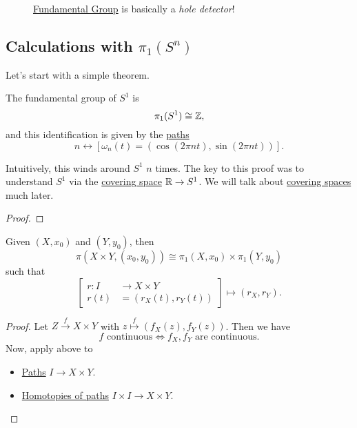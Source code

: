 \begin{figure}[H]
	\centering
	\caption{\hyperref[def:fundamental-group]{Fundamental Group} is basically a \emph{hole detector}!}
	\label{fig:fundamental-group-hole-detector}
\end{figure}

\subsection{Calculations with \(\pi _1(S^n)\)}
Let's start with a simple theorem.
\begin{theorem}
	The fundamental group of \(S^1\) is
	\[
		\pi _1(S^1)\cong \mathbb{\MakeUppercase{z}},
	\]
	and this identification is given by the \hyperref[def:path]{paths}
	\[
		n \leftrightarrow [\omega_{n}(t) = (\cos (2\pi nt), \sin (2\pi nt))].
	\]
\end{theorem}
\begin{remark}
	Intuitively, this winds around \(S^1\) \(n\) times. The key to this proof was to understand \(S^1\) via the \hyperref[def:covering-space]{covering space}
	\(\mathbb{\MakeUppercase{r}} \to S^1\). We will talk about \hyperref[def:covering-space]{covering spaces} much later.
\end{remark}
\begin{proof}
\end{proof}

\begin{theorem}
	Given \((X, x_0)\) and \((Y, y_0)\), then
	\[
		\pi (X\times Y, (x_0, y_0)) \cong \pi_1(X, x_0)\times \pi _1(Y, y_0)
	\]
	such that
	\[
		\left[\begin{alignedat}{3}
				r\colon I&\to X\times Y\\
				r(t) &= \left(r_X(t), r_Y(t)\right)
			\end{alignedat}\right] \mapsto (r_{X}, r_{Y}).
	\]
\end{theorem}
\begin{proof}
	Let \(Z\overset{f}{\to} X\times Y\) with \(z\overset{f}{\mapsto} \left(f_{X}(z), f_{Y}(z)\right)\). Then we have
	\[
		f\text{ continuous}\iff f_{X}, f_{Y}  \text{ are continuous}.
	\]
	Now, apply above to
	\begin{itemize}
		\item \hyperref[def:path]{Paths} \(I\to X\times Y\).
		\item \hyperref[def:homotopy-path]{Homotopies of paths} \(I\times I\to X\times Y\).
	\end{itemize}
\end{proof}

